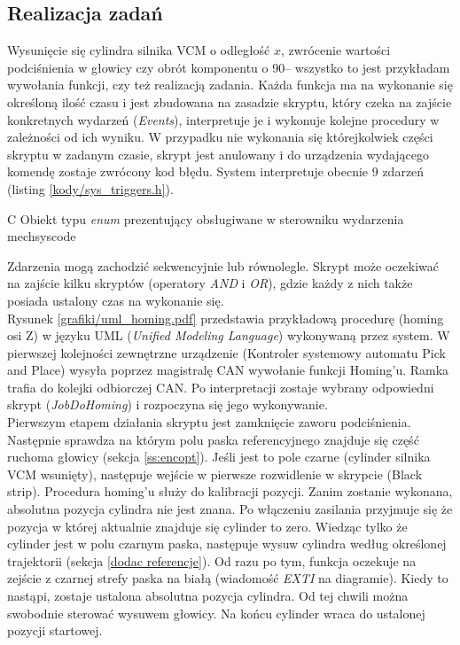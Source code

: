 \subsection{Realizacja zadań}

Wysunięcie się cylindra silnika VCM o odległość $ x $, zwrócenie wartości podciśnienia w głowicy czy obrót komponentu o 90\degree -- wszystko to jest przykładam wywołania funkcji, czy też realizacją zadania. Każda funkcja ma na wykonanie się określoną ilość czasu i jest zbudowana na zasadzie skryptu, który czeka na zajście konkretnych wydarzeń ({\it Events}), interpretuje je i wykonuje kolejne procedury w zależności od ich wyniku. W przypadku nie wykonania się którejkolwiek części skryptu w zadanym czasie, skrypt jest anulowany i do urządzenia wydającego komendę zostaje zwrócony kod błędu. System interpretuje obecnie 9 zdarzeń (listing \ref{kody/sys_triggers.h}).

		   {C}
		   {Obiekt typu {\it enum} prezentujący obsługiwane w sterowniku wydarzenia}
		   {mechsyscode}

Zdarzenia mogą zachodzić sekwencyjnie lub równolegle. Skrypt może oczekiwać na zajście kilku skryptów (operatory {\it AND} i {\it OR}), gdzie każdy z nich także posiada ustalony czas na wykonanie się. \\

Rysunek \ref{grafiki/uml_homing.pdf} przedstawia przykładową procedurę (homing osi Z) w języku UML ({\it Unified Modeling Language}) wykonywaną przez system. W pierwszej kolejności zewnętrzne urządzenie (Kontroler systemowy automatu Pick and Place) wysyła poprzez magistralę CAN wywołanie funkcji Homing'u. Ramka trafia do kolejki odbiorczej CAN. Po interpretacji zostaje wybrany odpowiedni skrypt ({\it JobDoHoming}) i rozpoczyna się jego wykonywanie. \\

Pierwszym etapem działania skryptu jest zamknięcie zaworu podciśnienia. Następnie sprawdza na którym polu paska referencyjnego znajduje się część ruchoma głowicy (sekcja \ref{ss:encopt}). Jeśli jest to pole czarne (cylinder silnika VCM wsunięty), następuje wejście w pierwsze rozwidlenie w skrypcie (Black strip). Procedura homing'u służy do kalibracji pozycji. Zanim zostanie wykonana, absolutna pozycja cylindra nie jest znana. Po włączeniu zasilania przyjmuje się że pozycja w której aktualnie znajduje się cylinder to zero. Wiedząc tylko że cylinder jest w polu czarnym paska, następuje wysuw cylindra według określonej trajektorii (sekcja \ref{dodac referencje}). Od razu po tym, funkcja oczekuje na zejście z czarnej strefy paska na białą (wiadomość {\it EXTI} na diagramie). Kiedy to nastąpi, zostaje ustalona absolutna pozycja cylindra. Od tej chwili można swobodnie sterować wysuwem głowicy. Na końcu cylinder wraca do ustalonej pozycji startowej.

